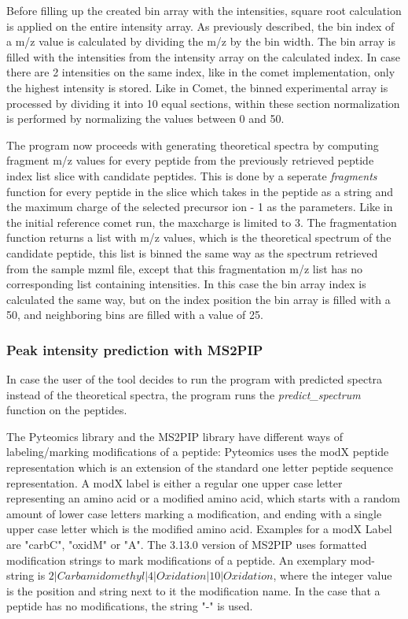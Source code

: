 \documentclass[11pt]{article}
\begin{document}
Before filling up the created bin array with the intensities, square root calculation is applied on the entire intensity array.
 As previously described, the bin index of a m/z value is calculated by dividing the m/z by the bin width. The bin array is filled with the intensities from the intensity array on the calculated index. In case there are 2 intensities on the same index, like in the comet implementation, only the highest intensity is stored. Like in Comet, the binned experimental array is processed by dividing it into 10 equal sections, within these section normalization is performed by normalizing the values between 0 and 50.

The program now proceeds with generating theoretical spectra by computing fragment m/z values for every peptide from the previously retrieved peptide index list slice with candidate peptides. This is done by a seperate \textit{fragments} function for every peptide in the slice which takes in the peptide as a string and the maximum charge of the selected precursor ion - 1 as the parameters. Like in the initial reference comet run, the maxcharge is limited to 3. The fragmentation function returns a list with m/z values, which is the theoretical spectrum of the candidate peptide, this list is binned the same way as the spectrum retrieved from the sample mzml file, except that this fragmentation m/z list has no corresponding list containing intensities. In this case the bin array index is calculated the same way, but on the index position the bin array is filled with a 50, and neighboring bins are filled with a value of 25. 

\subsubsection{Peak intensity prediction with MS2PIP}
In case the user of the tool decides to run the program with predicted spectra instead of the theoretical spectra, the program runs the \textit{predict\_spectrum} function on the peptides. 

The Pyteomics library and the MS2PIP library have different ways of labeling/marking modifications of a peptide: Pyteomics uses the modX peptide representation which is an extension of the standard one letter peptide sequence representation. A modX label is either a regular one upper case letter representing an amino acid or a modified amino acid, which starts with a random amount of lower case letters marking a modification, and ending with a single upper case letter which is the modified amino acid. Examples for a modX Label are "carbC", "oxidM" or "A". The 3.13.0 version of MS2PIP uses formatted modification strings to mark modifications of a peptide. An exemplary mod-string is \begin{math}2|Carbamidomethyl|4|Oxidation|10|Oxidation\end{math}, where the integer value is the position and string next to it the modification name. In the case that a peptide has no modifications, the string "-" is used. 
\end{document}

